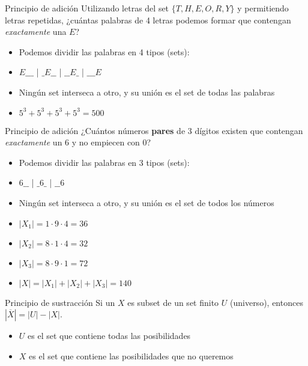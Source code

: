 \documentclass[10pt]{beamer}
\newcommand{\bi}{\begin{itemize}}
\newcommand{\ei}{\end{itemize}}
\begin{document}
\begin{frame}{Principio de adición}
  Utilizando letras del set $\{T, H, E, O, R, Y\}$ y permitiendo letras repetidas, 
  ¿cuántas palabras de 4 letras podemos formar que contengan \textit{exactamente} una $E$?

  \bi
    \item Podemos dividir las palabras en 4 tipos (sets):
    \item $E\_\_\_$ | $\_E\_\_$ | $\_\_E\_$ | $\_\_\_E$
    \item Ningún set interseca a otro, y su unión es el set de todas las palabras
    \item<3-> $5^3 + 5^3 + 5^3 + 5^3 = 500$
  \ei
\end{frame}

\begin{frame}{Principio de adición}
  ¿Cuántos números \textbf{pares} de 3 dígitos existen que contengan \textit{exactamente} un $6$ 
  y no empiecen con $0$?

  \bi
    \item Podemos dividir las palabras en 3 tipos (sets):
    \item $6\_\_$ | $\_6\_$ | $\_\_6$
    \item Ningún set interseca a otro, y su unión es el set de todos los números
    \item<3-> $|X_1| = 1 \cdot 9 \cdot 4 = 36$
    \item<3-> $|X_2| = 8 \cdot 1 \cdot 4 = 32$
    \item<3-> $|X_3| = 8 \cdot 9 \cdot 1 = 72$
    \item<4-> $|X| = |X_1| + |X_2| + |X_3| = 140$
  \ei
\end{frame}

\begin{frame}{Principio de sustracción}
  Si un  $X$ es subset de un set finito $U$ (universo), entonces $|\overline{X}| = |U| - |X|$.

  \bi
    \item<2-> $U$ es el set que contiene todas las posibilidades
    \item<2-> $X$ es el set que contiene las posibilidades que no queremos
  \ei
\end{frame}
\end{document}
